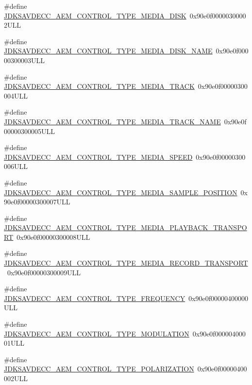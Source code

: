 \begin{DoxyCompactItemize}
\item 
\#define \hyperlink{group__control__type_ga88a9369b64afba907be1215de0928b30}{J\+D\+K\+S\+A\+V\+D\+E\+C\+C\+\_\+\+A\+E\+M\+\_\+\+C\+O\+N\+T\+R\+O\+L\+\_\+\+T\+Y\+P\+E\+\_\+\+M\+E\+D\+I\+A\+\_\+\+D\+I\+SK}~0x90e0f00000300002\+U\+LL
\item 
\#define \hyperlink{group__control__type_ga45814d02fe05abd4c6e24f9a5f8ae905}{J\+D\+K\+S\+A\+V\+D\+E\+C\+C\+\_\+\+A\+E\+M\+\_\+\+C\+O\+N\+T\+R\+O\+L\+\_\+\+T\+Y\+P\+E\+\_\+\+M\+E\+D\+I\+A\+\_\+\+D\+I\+S\+K\+\_\+\+N\+A\+ME}~0x90e0f00000300003\+U\+LL
\item 
\#define \hyperlink{group__control__type_ga57fcc831f74468e3c14dbf647fd65e45}{J\+D\+K\+S\+A\+V\+D\+E\+C\+C\+\_\+\+A\+E\+M\+\_\+\+C\+O\+N\+T\+R\+O\+L\+\_\+\+T\+Y\+P\+E\+\_\+\+M\+E\+D\+I\+A\+\_\+\+T\+R\+A\+CK}~0x90e0f00000300004\+U\+LL
\item 
\#define \hyperlink{group__control__type_ga614eeb3cf04329a79d8fd01efb555f7b}{J\+D\+K\+S\+A\+V\+D\+E\+C\+C\+\_\+\+A\+E\+M\+\_\+\+C\+O\+N\+T\+R\+O\+L\+\_\+\+T\+Y\+P\+E\+\_\+\+M\+E\+D\+I\+A\+\_\+\+T\+R\+A\+C\+K\+\_\+\+N\+A\+ME}~0x90e0f00000300005\+U\+LL
\item 
\#define \hyperlink{group__control__type_ga3cf89a7cc33e11bb414a2a19570b586f}{J\+D\+K\+S\+A\+V\+D\+E\+C\+C\+\_\+\+A\+E\+M\+\_\+\+C\+O\+N\+T\+R\+O\+L\+\_\+\+T\+Y\+P\+E\+\_\+\+M\+E\+D\+I\+A\+\_\+\+S\+P\+E\+ED}~0x90e0f00000300006\+U\+LL
\item 
\#define \hyperlink{group__control__type_gad02e939251a93e61ab6a269bca640bee}{J\+D\+K\+S\+A\+V\+D\+E\+C\+C\+\_\+\+A\+E\+M\+\_\+\+C\+O\+N\+T\+R\+O\+L\+\_\+\+T\+Y\+P\+E\+\_\+\+M\+E\+D\+I\+A\+\_\+\+S\+A\+M\+P\+L\+E\+\_\+\+P\+O\+S\+I\+T\+I\+ON}~0x90e0f00000300007\+U\+LL
\item 
\#define \hyperlink{group__control__type_ga4499c1cf198ed16fe5cbb5e6442834ec}{J\+D\+K\+S\+A\+V\+D\+E\+C\+C\+\_\+\+A\+E\+M\+\_\+\+C\+O\+N\+T\+R\+O\+L\+\_\+\+T\+Y\+P\+E\+\_\+\+M\+E\+D\+I\+A\+\_\+\+P\+L\+A\+Y\+B\+A\+C\+K\+\_\+\+T\+R\+A\+N\+S\+P\+O\+RT}~0x90e0f00000300008\+U\+LL
\item 
\#define \hyperlink{group__control__type_gab04ceb740c4c0a356f1516c0563111e1}{J\+D\+K\+S\+A\+V\+D\+E\+C\+C\+\_\+\+A\+E\+M\+\_\+\+C\+O\+N\+T\+R\+O\+L\+\_\+\+T\+Y\+P\+E\+\_\+\+M\+E\+D\+I\+A\+\_\+\+R\+E\+C\+O\+R\+D\+\_\+\+T\+R\+A\+N\+S\+P\+O\+RT}~0x90e0f00000300009\+U\+LL
\item 
\#define \hyperlink{group__control__type_gaed72a580641f16dae5f0fe27a85d7fb3}{J\+D\+K\+S\+A\+V\+D\+E\+C\+C\+\_\+\+A\+E\+M\+\_\+\+C\+O\+N\+T\+R\+O\+L\+\_\+\+T\+Y\+P\+E\+\_\+\+F\+R\+E\+Q\+U\+E\+N\+CY}~0x90e0f00000400000\+U\+LL
\item 
\#define \hyperlink{group__control__type_gabc7eaa63dd9e360b74391374baaf4a1f}{J\+D\+K\+S\+A\+V\+D\+E\+C\+C\+\_\+\+A\+E\+M\+\_\+\+C\+O\+N\+T\+R\+O\+L\+\_\+\+T\+Y\+P\+E\+\_\+\+M\+O\+D\+U\+L\+A\+T\+I\+ON}~0x90e0f00000400001\+U\+LL
\item 
\#define \hyperlink{group__control__type_gad867e76476083a6d867619e44ae6baf8}{J\+D\+K\+S\+A\+V\+D\+E\+C\+C\+\_\+\+A\+E\+M\+\_\+\+C\+O\+N\+T\+R\+O\+L\+\_\+\+T\+Y\+P\+E\+\_\+\+P\+O\+L\+A\+R\+I\+Z\+A\+T\+I\+ON}~0x90e0f00000400002\+U\+LL
\end{DoxyCompactItemize}


